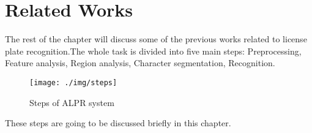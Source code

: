 \section{Related Works}
The rest of the chapter will discuss some of the previous works related to license plate recognition.The whole task is divided into five main steps: Preprocessing, Feature analysis, Region analysis, Character segmentation, Recognition.
	
    \begin{figure}[ht]
    \centering
    \texttt{[image: ./img/steps]}
    \caption{Steps of ALPR system}
	\label{fig:STEPS}
    \end{figure} 
    
These steps are going to be discussed briefly in this chapter.
\clearpage